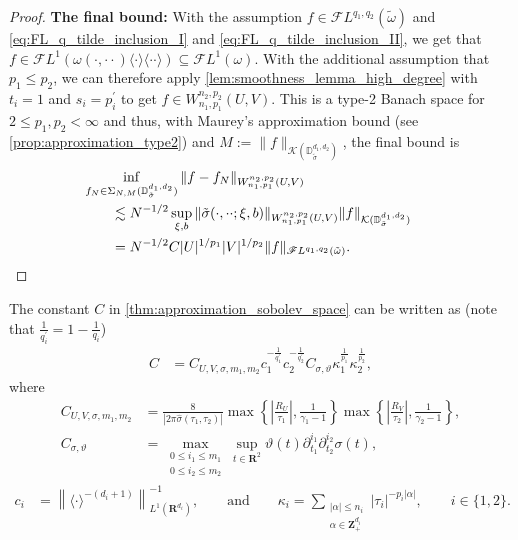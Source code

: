 \documentclass[a4paper]{article}
\newcommand{\rr}[1]{\mathbf{R}^{#1}}
\newcommand{\zzp}[1]{\mathbf{Z}_+^{#1}}
\newcommand{\eabs}[1]{\langle #1\rangle}     %
\newcommand{\abs}[1]{| #1|}     %
\newcommand{\absbig}[1]{\left| #1\right|}     %
\newcommand{\norm}[2]{\|#1\|_{#2}}
\newcommand{\normbig}[2]{\left\|#1\right\|_{#2}}
\newcommand{\F}[0]{\mathscr{F}}
\newcommand{\FL}[1]{\F L^{#1}}
\numberwithin{equation}{section}
\theoremstyle{remark}
\begin{document}
\begin{proof}
    \textbf{The final bound:}
    With the assumption $f\in\FL{q_1,q_2}(\tilde{\omega})$ and
    \cref{eq:FL_q_tilde_inclusion_I} and \cref{eq:FL_q_tilde_inclusion_II},
    we get that
    $f\in\FL{1}(\omega(\cdot,\cdot\cdot)\eabs{\cdot}\eabs{\cdot\cdot})\subseteq\FL{1}(\omega)$.
    With the additional assumption that $p_1\leq p_2$, we can therefore apply \cref{lem:smoothness_lemma_high_degree} with $t_i=1$ and $s_i=p_i^\prime$
    to get $f\in W_{n_1,p_1}^{n_2,p_2}(U,V)$.
    This is a type-2 Banach space
    for $2\leq p_1,p_2<\infty$
    and thus, with Maurey's approximation bound (see \cref{prop:approximation_type2})
    and $M:=\norm{f}{\mathcal{K}(\mathbb{D}_{\tilde{\sigma}}^{d_1,d_2})}$,
    the final bound is
    \begin{align*}
        &\kern-2em\inf_{f_N\in\Sigma_{N,M}(\mathbb{D}_{\tilde{\sigma}}^{d_1,d_2})}
        \norm{f-f_N}{W_{n_1,p_1}^{n_2,p_2}(U, V)}
        \\
        &\lesssim N^{-1/2}
            \sup_{\xi,b}
                \norm{\tilde{\sigma}(\cdot,\cdot\cdot;\xi,b)}{W_{n_1,p_1}^{n_2,p_2}(U, V)}
            \norm{f}{\mathcal{K}(\mathbb{D}_{\tilde{\sigma}}^{d_1,d_2})}\\
            &=N^{-1/2}
                C
                \abs{U}^{1/p_1}\abs{V}^{1/p_2}
                \norm{f}{\FL{q_1,q_2}(\tilde{\omega})}.
    \end{align*}
\end{proof}



The constant $C$ in \cref{thm:approximation_sobolev_space} can be written as (note that $\frac{1}{q_i^\prime}=1-\frac{1}{q_i}$)
\begin{align*}
\label{eq:constant_splitting}
    C
    &=C_{U,V,\sigma,m_1,m_2}
        c_1^{-\frac{1}{q_1^\prime}}
        c_2^{-\frac{1}{q_2^\prime}}
        C_{\sigma,\vartheta}
        \kappa_1^{\frac{1}{p_1}}
        \kappa_2^{\frac{1}{p_2}},
\end{align*}
where 
\begin{align*}
    C_{U,V,\sigma,m_1,m_2}
    &=
    \frac{8}{\abs{2\pi\hat{\sigma}(\tau_1,\tau_2)}}\max\left\{\absbig{\frac{R_U}{\tau_1}},\frac{1}{\gamma_1-1}\right\}
    \max\left\{\absbig{\frac{R_V}{\tau_2}},\frac{1}{\gamma_2-1}\right\},\\
    C_{\sigma,\vartheta}
        &=  \max_{\substack{0\leq i_1\leq m_1\\0\leq i_2\leq m_2}}
            \sup_{t\in\rr{2}}
            \vartheta(t)
            \partial_{t_1}^{i_1}\partial_{t_2}^{i_2}\sigma(t),
\end{align*}
\begin{align*}
    c_i&=\normbig{\eabs{\cdot}^{-(d_i+1)}}{L^1(\rr{d_i})}^{-1},
    \qquad\text{and}\qquad
    \kappa_i=
    \sum_{\substack{\abs{\alpha}\leq n_i
    \\
    \alpha\in \zzp{d_i}}}
            \abs{\tau_i}^{-p_i\abs{\alpha}},\qquad i\in \{1, 2\}.
\end{align*}
\end{document}
